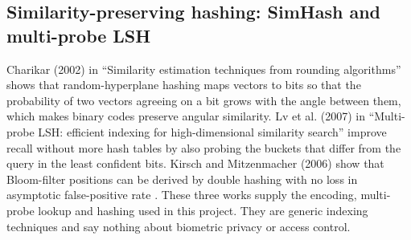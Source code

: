 \documentclass[12pt,a4paper,oneside]{report}
\begin{document}
\subsection{Similarity-preserving hashing: SimHash and multi-probe LSH}
Charikar (2002) in ``Similarity estimation techniques from rounding algorithms'' \cite{ref14} shows that random-hyperplane hashing maps vectors to bits so that the probability of two vectors agreeing on a bit grows with the angle between them, which makes binary codes preserve angular similarity. Lv et al. (2007) in ``Multi-probe LSH: efficient indexing for high-dimensional similarity search'' \cite{ref15} improve recall without more hash tables by also probing the buckets that differ from the query in the least confident bits. Kirsch and Mitzenmacher (2006) show that Bloom-filter positions can be derived by double hashing with no loss in asymptotic false-positive rate \cite{ref16}. These three works supply the encoding, multi-probe lookup and hashing used in this project. They are generic indexing techniques and say nothing about biometric privacy or access control.
\end{document}
